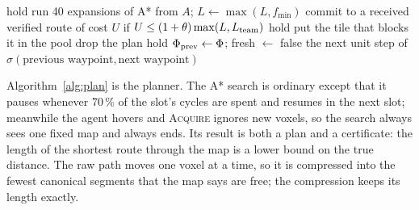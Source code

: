 \documentclass[11pt,a4paper]{article}
\begin{document}
\begin{algorithm}[htbp]
\caption{\textsc{Decide}: re-planning, certificates and escapes (steps 4--6)}\label{alg:decide}
\begin{algorithmic}[1]
   \Return hold \EndIf
   
    \State run 40 expansions of A* from $A$;\; $L\gets\max(L,f_{\min})$ 
    \State commit to a received verified route of cost $U$ if $U\le(1+\theta)\max(L,L_{\rm team})$ 
    \State \Return hold
  \EndIf
   \Return {} \EndIf
    \State put the tile that blocks it in the pool 
    \State drop the plan
  \EndIf
     \Return hold  \EndIf
     \Return {}  \EndIf
  \EndIf
   \Return {} 
  \EndIf
    \State \Return {} 
  \EndIf
  \State $\Phi_{\rm prev}\gets\Phi$;\; fresh $\gets$ false
  \State \Return the next unit step of $\sigma(\text{previous waypoint},\text{next waypoint})$
\EndFunction
\end{algorithmic}
\end{algorithm}

Algorithm~\ref{alg:plan} is the planner. The A* search is ordinary except that it pauses whenever 70\,\% of the slot's
cycles are spent and resumes in the next slot; meanwhile the agent hovers and \textsc{Acquire} ignores new voxels, so
the search always sees one fixed map and always ends. Its result is both a plan and a certificate: the length of the
shortest route through the map is a lower bound on the true distance. The raw path moves one voxel at a time, so it is
compressed into the fewest canonical segments that the map says are free; the compression keeps its length exactly.
\end{document}
